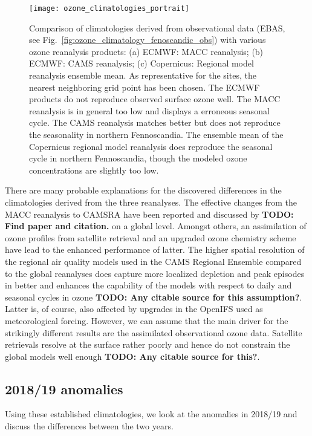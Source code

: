 \documentclass[bg, manuscript]{copernicus}
\begin{document}
\begin{figure}[t]
  \texttt{[image: ozone\_climatologies\_portrait]}
  \caption{Comparison of climatologies derived from observational data (EBAS, see Fig.~\ref{fig:ozone_climatology_fenoscandic_obs}) with various ozone reanalysis products: (a) ECMWF: MACC reanalysis; (b) ECMWF: CAMS reanalysis; (c) Copernicus: Regional model reanalysis ensemble mean. As representative for the sites, the nearest neighboring grid point has been chosen. The ECMWF products do not reproduce observed surface ozone well. The MACC reanalysis is in general too low and displays a erroneous seasonal cycle. The CAMS reanalysis matches better but does not reproduce the seasonality in northern Fennoscandia. The ensemble mean of the Copernicus regional model reanalysis does reproduce the seasonal cycle in northern Fennoscandia, though the modeled ozone concentrations are slightly too low.}
  \label{fig:ozone_climatologies}
\end{figure}

There are many probable explanations for the discovered differences in the climatologies derived from the three reanalyses. The effective changes from the MACC reanalysis to CAMSRA have been reported and discussed by {\bf TODO: Find paper and citation.} on a global level. Amongst others, an assimilation of ozone profiles from satellite retrieval and an upgraded ozone chemistry scheme have lead to the enhanced performance of latter. The higher spatial resolution of the regional air quality models used in the CAMS Regional Ensemble compared to the global reanalyses does capture more localized depletion and peak episodes in \chem{[O_3]} better and enhances the capability of the models with respect to daily and seasonal cycles in ozone {\bf TODO: Any citable source for this assumption?}. Latter is, of course, also affected by upgrades in the OpenIFS used as meteorological forcing. However, we can assume that the main driver for the strikingly different results are the assimilated observational ozone data. Satellite retrievals resolve \chem{[O_3]} at the surface rather poorly and hence do not constrain the global models well enough {\bf TODO: Any citable source for this?}.

\subsection{2018/19 anomalies}
\label{subsec:anomalies}
Using these established climatologies, we look at the anomalies in 2018/19 and discuss the differences between the two years. 
\end{document}
